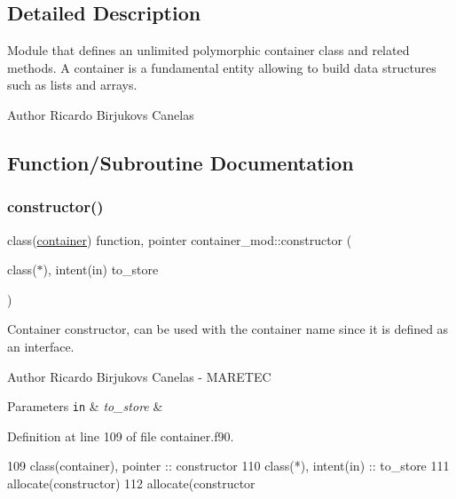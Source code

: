 \subsection{Detailed Description}
Module that defines an unlimited polymorphic container class and related methods. A container is a fundamental entity allowing to build data structures such as lists and arrays. 

\begin{DoxyAuthor}{Author}
Ricardo Birjukovs Canelas 
\end{DoxyAuthor}


\subsection{Function/\+Subroutine Documentation}
\mbox{\label{namespacecontainer__mod_a6262df4ff34024d566cf8261dc20a248}} 
\subsubsection{\texorpdfstring{constructor()}{constructor()}}
{\footnotesize\ttfamily class(\mbox{\hyperlink{structcontainer__mod_1_1container}{container}}) function, pointer container\+\_\+mod\+::constructor (\begin{DoxyParamCaption}\item[{class($\ast$), intent(in)}]{to\+\_\+store }\end{DoxyParamCaption})\hspace{0.3cm}{\ttfamily [private]}}



Container constructor, can be used with the \textquotesingle{}container\textquotesingle{} name since it is defined as an interface. 

\begin{DoxyAuthor}{Author}
Ricardo Birjukovs Canelas -\/ M\+A\+R\+E\+T\+EC 
\end{DoxyAuthor}

\begin{DoxyParams}[1]{Parameters}
\mbox{\tt in}  & {\em to\+\_\+store} & \\
\hline
\end{DoxyParams}


Definition at line 109 of file container.\+f90.


\begin{DoxyCode}
109     \textcolor{keywordtype}{class}(container), \textcolor{keywordtype}{pointer} :: constructor
110     \textcolor{keywordtype}{class}(*), \textcolor{keywordtype}{intent(in)} :: to\_store
111     \textcolor{keyword}{allocate}(constructor)
112     \textcolor{keyword}{allocate}(constructor%
\end{DoxyCode}
\mbox{\label{namespacecontainer__mod_a23a016e747d896622127c0c21dca9836}} 
